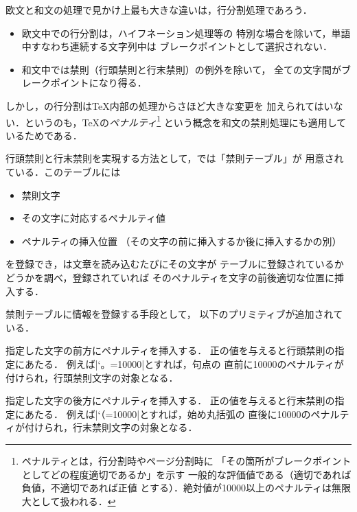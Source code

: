\documentclass[a4paper,11pt,nomag,dvipdfmx]{jsarticle}
\begin{document}
欧文と和文の処理で見かけ上最も大きな違いは，行分割処理であろう．
\begin{itemize}
\item 欧文中での行分割は，ハイフネーション処理等の
      特別な場合を除いて，単語中すなわち連続する文字列中は
      ブレークポイントとして選択されない．
\item 和文中では禁則（行頭禁則と行末禁則）の例外を除いて，
      全ての文字間がブレークポイントになり得る．
\end{itemize}
しかし，\pTeX の行分割は\TeX 内部の処理からさほど大きな変更を
加えられてはいない．というのも，\TeX の\emph{ペナルティ}\footnote{%
ペナルティとは，行分割時やページ分割時に
「その箇所がブレークポイントとしてどの程度適切であるか」を示す
一般的な評価値である（適切であれば負値，不適切であれば正値
とする）．絶対値が10000以上のペナルティは無限大として扱われる．}%
という概念を和文の禁則処理にも適用しているためである．

行頭禁則と行末禁則を実現する方法として，\pTeX では「禁則テーブル」が
用意されている．このテーブルには
\begin{itemize}
\item 禁則文字
\item その文字に対応するペナルティ値
\item ペナルティの挿入位置
      （その文字の前に挿入するか後に挿入するかの別）
\end{itemize}
を登録でき，\pTeX は文章を読み込むたびにその文字が
テーブルに登録されているかどうかを調べ，登録されていれば
そのペナルティを文字の前後適切な位置に挿入する．

禁則テーブルに情報を登録する手段として，
以下のプリミティブが追加されている．

\begin{cslist}
\csitem[\.{prebreakpenalty} <character code>=<number>]
  指定した文字の前方にペナルティを挿入する．
  正の値を与えると行頭禁則の指定にあたる．
  例えば|\prebreakpenalty`。=10000|とすれば，句点の
  直前に10000のペナルティが付けられ，行頭禁則文字の対象となる．

\csitem[\.{postbreakpenalty} <character code>=<number>]
  指定した文字の後方にペナルティを挿入する．
  正の値を与えると行末禁則の指定にあたる．
  例えば|\postbreakpenalty`（=10000|とすれば，始め丸括弧の
  直後に10000のペナルティが付けられ，行末禁則文字の対象となる．
\end{cslist}
\end{document}
